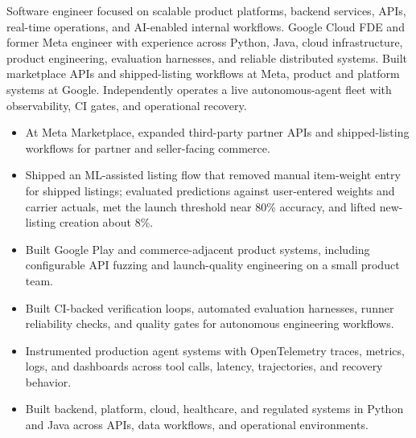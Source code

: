 


Software engineer focused on scalable product platforms, backend services, APIs, real-time operations, and AI-enabled internal workflows. Google Cloud FDE and former Meta engineer with experience across Python, Java, cloud infrastructure, product engineering, evaluation harnesses, and reliable distributed systems. Built marketplace APIs and shipped-listing workflows at Meta, product and platform systems at Google. Independently operates a live autonomous-agent fleet with observability, CI gates, and operational recovery.
\begin{itemize}
  \item At Meta Marketplace, expanded third-party partner APIs and shipped-listing workflows for partner and seller-facing commerce.
  \item Shipped an ML-assisted listing flow that removed manual item-weight entry for shipped listings; evaluated predictions against user-entered weights and carrier actuals, met the launch threshold near 80\% accuracy, and lifted new-listing creation about 8\%.
  \item Built Google Play and commerce-adjacent product systems, including configurable API fuzzing and launch-quality engineering on a small product team.
\end{itemize}
\begin{itemize}
  \item Built CI-backed verification loops, automated evaluation harnesses, runner reliability checks, and quality gates for autonomous engineering workflows.
  \item Instrumented production agent systems with OpenTelemetry traces, metrics, logs, and dashboards across tool calls, latency, trajectories, and recovery behavior.
  \item Built backend, platform, cloud, healthcare, and regulated systems in Python and Java across APIs, data workflows, and operational environments.
\end{itemize}




